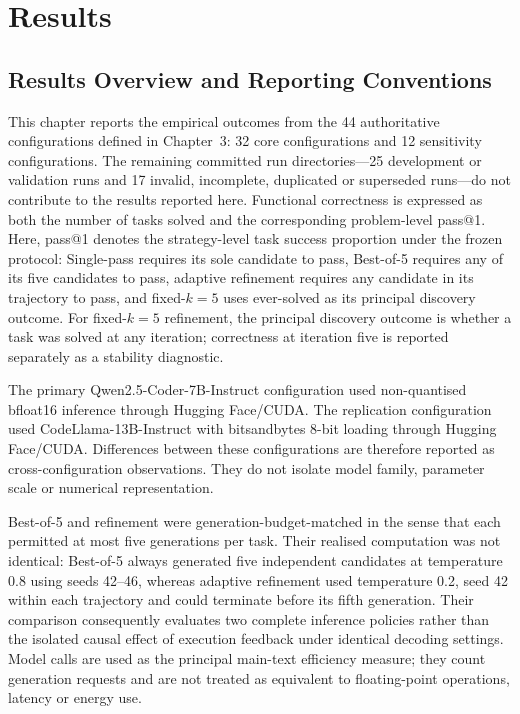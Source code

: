 \chapter{Results}

\section{Results Overview and Reporting Conventions}

This chapter reports the empirical outcomes from the 44 authoritative configurations defined in Chapter~3: 32 core configurations and 12 sensitivity configurations. The remaining committed run directories---25 development or validation runs and 17 invalid, incomplete, duplicated or superseded runs---do not contribute to the results reported here. Functional correctness is expressed as both the number of tasks solved and the corresponding problem-level pass@1. Here, pass@1 denotes the strategy-level task success proportion under the frozen protocol: Single-pass requires its sole candidate to pass, Best-of-5 requires any of its five candidates to pass, adaptive refinement requires any candidate in its trajectory to pass, and fixed-$k=5$ uses ever-solved as its principal discovery outcome. For fixed-$k=5$ refinement, the principal discovery outcome is whether a task was solved at any iteration; correctness at iteration five is reported separately as a stability diagnostic.

The primary Qwen2.5-Coder-7B-Instruct configuration used non-quantised bfloat16 inference through Hugging Face/CUDA. The replication configuration used CodeLlama-13B-Instruct with bitsandbytes 8-bit loading through Hugging Face/CUDA. Differences between these configurations are therefore reported as cross-configuration observations. They do not isolate model family, parameter scale or numerical representation.

Best-of-5 and refinement were generation-budget-matched in the sense that each permitted at most five generations per task. Their realised computation was not identical: Best-of-5 always generated five independent candidates at temperature 0.8 using seeds 42--46, whereas adaptive refinement used temperature 0.2, seed 42 within each trajectory and could terminate before its fifth generation. Their comparison consequently evaluates two complete inference policies rather than the isolated causal effect of execution feedback under identical decoding settings. Model calls are used as the principal main-text efficiency measure; they count generation requests and are not treated as equivalent to floating-point operations, latency or energy use.

